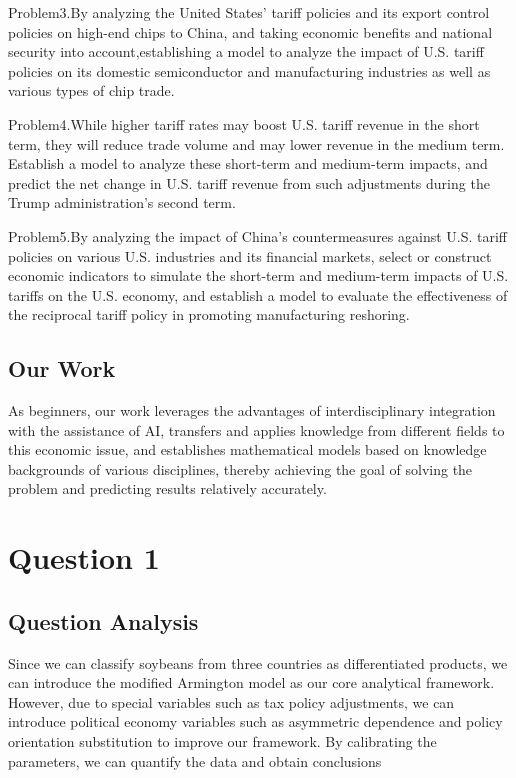 \documentclass{apmcmthesis}
\begin{document}
Problem3.By analyzing the United States' tariff policies and its export control policies on high-end chips to China, and taking economic benefits and national security into account,establishing a model to analyze the impact of U.S. tariff policies on its domestic semiconductor and manufacturing industries as well as various types of chip trade.

Problem4.While higher tariff rates may boost U.S. tariff revenue in the short term, they will reduce trade volume and may lower revenue in the medium term. Establish a model to analyze these short-term and medium-term impacts, and predict the net change in U.S. tariff revenue from such adjustments during the Trump administration's second term.

Problem5.By analyzing the impact of China's countermeasures against U.S. tariff policies on various U.S. industries and its financial markets, select or construct economic indicators to simulate the short-term and medium-term impacts of U.S. tariffs on the U.S. economy, and establish a model to evaluate the effectiveness of the reciprocal tariff policy in promoting manufacturing reshoring.




\subsection{Our Work}
As beginners, our work leverages the advantages of interdisciplinary integration with the assistance of AI, transfers and applies knowledge from different fields to this economic issue, and establishes mathematical models based on knowledge backgrounds of various disciplines, thereby achieving the goal of solving the problem and predicting results relatively accurately.


\section{Question 1}
\subsection{Question Analysis}
Since we can classify soybeans from three countries as differentiated products, we can introduce the modified Armington model as our core analytical framework. However, due to special variables such as tax policy adjustments, we can introduce political economy variables such as asymmetric dependence and policy orientation substitution to improve our framework. By calibrating the parameters, we can quantify the data and obtain conclusions
\end{document}
